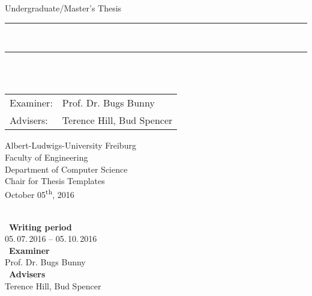 
\begin{titlepage}
\begin{center}

\newcommand{\HorizontalLine}{\rule{\linewidth}{0.3mm}}

{\Large Undergraduate/Master's Thesis}\\[1.3cm]


\HorizontalLine \\[0.4cm]
{ \huge \bfseries \thetitle }
\HorizontalLine \\[1.5cm]


{\Huge \theauthor} \\[2cm]


\begin{tabular}[hc]{>{\huge}l >{\huge}l}
  Examiner: & Prof. Dr. Bugs Bunny \\[0.3cm]
  Advisers: & Terence Hill, Bud Spencer \\[1.2cm]
\end{tabular}
\vfill  %

\Large {
    Albert-Ludwigs-University Freiburg\\
    Faculty of Engineering\\
    Department of Computer Science\\
    Chair for Thesis Templates\\[1cm]

    October 05\textsuperscript{th}, 2016\\
}
\end{center}
\end{titlepage}

\ \vfill \ \\  %
\
\textbf{Writing period}            \smallskip{} \\
05.\,07.\,2016 -- 05.\,10.\,2016   \bigskip{} \\
\
\textbf{Examiner}                  \smallskip{} \\
Prof. Dr. Bugs Bunny               \bigskip{} \\
\
\textbf{Advisers}                  \smallskip{} \\
Terence Hill, Bud Spencer
